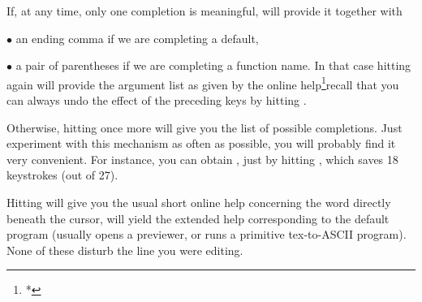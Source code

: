   If, at any time, only one completion is meaningful,  will provide it
together with

$\bullet$ an ending comma if we are completing a default,

$\bullet$ a pair of parentheses if we are completing a function name. In
that case hitting  again will provide the argument list as given
by the online help\footnote{*}{recall that you can always undo the effect
of the preceding keys by hitting }.

Otherwise, hitting  once more will give you the list of possible
completions. Just experiment with this mechanism as often as possible,
you will probably find it very convenient. For instance, you can obtain
, just by hitting ,
which saves 18 keystrokes (out of 27).

  Hitting  will give you the usual short online help concerning the
word directly beneath the cursor,  will yield the extended help
corresponding to the  default program (usually opens a 
previewer, or runs a primitive tex-to-ASCII program). None of these disturb
the line you were editing.
\vfill\eject
